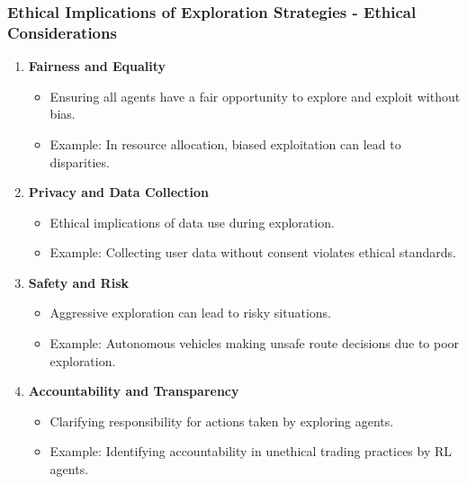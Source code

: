 \documentclass[aspectratio=169]{beamer}
\begin{document}
\begin{frame}[fragile]
    \frametitle{Ethical Implications of Exploration Strategies - Ethical Considerations}
    \begin{enumerate}
        \item \textbf{Fairness and Equality}
            \begin{itemize}
                \item Ensuring all agents have a fair opportunity to explore and exploit without bias.
                \item Example: In resource allocation, biased exploitation can lead to disparities.
            \end{itemize}
        \item \textbf{Privacy and Data Collection}
            \begin{itemize}
                \item Ethical implications of data use during exploration.
                \item Example: Collecting user data without consent violates ethical standards.
            \end{itemize}
        \item \textbf{Safety and Risk}
            \begin{itemize}
                \item Aggressive exploration can lead to risky situations.
                \item Example: Autonomous vehicles making unsafe route decisions due to poor exploration.
            \end{itemize}
        \item \textbf{Accountability and Transparency}
            \begin{itemize}
                \item Clarifying responsibility for actions taken by exploring agents.
                \item Example: Identifying accountability in unethical trading practices by RL agents.
            \end{itemize}
    \end{enumerate}
\end{frame}
\end{document}
